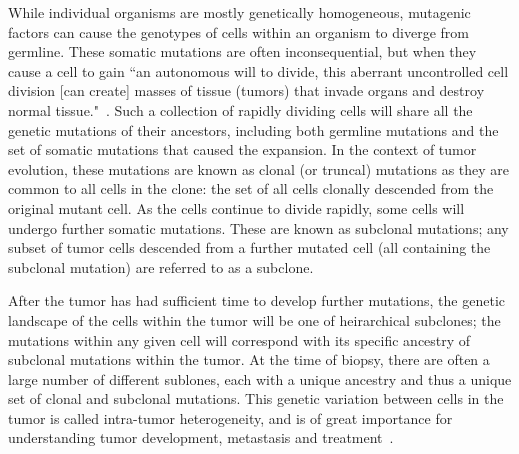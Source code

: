 \documentclass[../../main.tex]{subfiles}
\begin{document}
While individual organisms are mostly genetically homogeneous, mutagenic factors can cause the genotypes of cells within an organism to diverge from germline.
These somatic mutations are often inconsequential, but when they cause a cell to gain ``an autonomous will to divide, this aberrant uncontrolled cell division [can create] masses of tissue (tumors) that invade organs and destroy normal tissue."~\cite{EmperorMaladies}. 
Such a collection of rapidly dividing cells will share all the genetic mutations of their ancestors, including both germline mutations and the set of somatic mutations that caused the expansion.
In the context of tumor evolution, these mutations are known as clonal (or truncal) mutations as they are common to all cells in the clone: the set of all cells clonally descended from the original mutant cell.
As the cells continue to divide rapidly, some cells will undergo further somatic mutations.
These are known as subclonal mutations; any subset of tumor cells descended from a further mutated cell (all containing the subclonal mutation) are referred to as a subclone.

After the tumor has had sufficient time to develop further mutations, the genetic landscape of the cells within the tumor will be one of heirarchical subclones; the mutations within any given cell will correspond with its specific ancestry of subclonal mutations within the tumor.
At the time of biopsy, there are often a large number of different sublones, each with a unique ancestry and thus a unique set of clonal and subclonal mutations.
This genetic variation between cells in the tumor is called intra-tumor heterogeneity, and is of great importance for understanding tumor development, metastasis and treatment~\cite{metastatic}.


\end{document}
